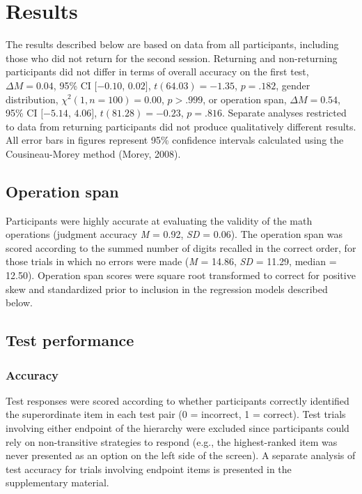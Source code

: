 \documentclass[floatsintext,man]{apa6}
\theoremstyle{definition}
\theoremstyle{definition}
\theoremstyle{definition}
\theoremstyle{remark}
\begin{document}
\section{Results}\label{results}

The results described below are based on data from all participants,
including those who did not return for the second session. Returning and
non-returning participants did not differ in terms of overall accuracy
on the first test, \(\Delta M = 0.04\), 95\% CI \([-0.10\), \(0.02]\),
\(t(64.03) = -1.35\), \(p = .182\), gender distribution,
\(\chi^2(1, n = 100) = 0.00\), \(p > .999\), or operation span,
\(\Delta M = 0.54\), 95\% CI \([-5.14\), \(4.06]\),
\(t(81.28) = -0.23\), \(p = .816\). Separate analyses restricted to data
from returning participants did not produce qualitatively different
results. All error bars in figures represent 95\% confidence intervals
calculated using the Cousineau-Morey method (Morey, 2008).

\subsection{Operation span}\label{operation-span}

Participants were highly accurate at evaluating the validity of the math
operations (judgment accuracy \emph{M} = 0.92, \emph{SD} = 0.06). The
operation span was scored according to the summed number of digits
recalled in the correct order, for those trials in which no errors were
made (\emph{M} = 14.86, \emph{SD} = 11.29, median = 12.50). Operation
span scores were square root transformed to correct for positive skew
and standardized prior to inclusion in the regression models described
below.

\subsection{Test performance}\label{test-performance}

\subsubsection{Accuracy}\label{accuracy}

Test responses were scored according to whether participants correctly
identified the superordinate item in each test pair (0 = incorrect, 1 =
correct). Test trials involving either endpoint of the hierarchy were
excluded since participants could rely on non-transitive strategies to
respond (e.g., the highest-ranked item was never presented as an option
on the left side of the screen). A separate analysis of test accuracy
for trials involving endpoint items is presented in the supplementary
material.
\end{document}
